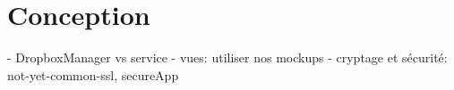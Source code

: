 
\section{Conception}

- DropboxManager vs service
- vues: utiliser nos mockups
- cryptage et sécurité: not-yet-common-ssl, secureApp
